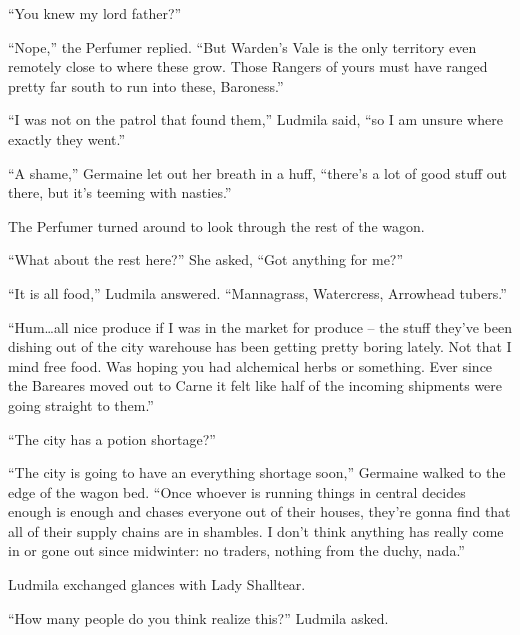 “You knew my lord father?”

 

“Nope,” the Perfumer replied. “But Warden’s Vale is the only territory even remotely close to where these grow. Those Rangers of yours must have ranged pretty far south to run into these, Baroness.”

 

“I was not on the patrol that found them,” Ludmila said, “so I am unsure where exactly they went.”

 

“A shame,” Germaine let out her breath in a huff, “there’s a lot of good stuff out there, but it’s teeming with nasties.”

 

The Perfumer turned around to look through the rest of the wagon.

 

“What about the rest here?” She asked, “Got anything for me?”

 

“It is all food,” Ludmila answered. “Mannagrass, Watercress, Arrowhead tubers.”

 

“Hum…all nice produce if I was in the market for produce – the stuff they’ve been dishing out of the city warehouse has been getting pretty boring lately. Not that I mind free food. Was hoping you had alchemical herbs or something. Ever since the Bareares moved out to Carne it felt like half of the incoming shipments were going straight to them.”

 

“The city has a potion shortage?”

 

“The city is going to have an everything shortage soon,” Germaine walked to the edge of the wagon bed. “Once whoever is running things in central decides enough is enough and chases everyone out of their houses, they’re gonna find that all of their supply chains are in shambles. I don’t think anything has really come in or gone out since midwinter: no traders, nothing from the duchy, nada.”

 

Ludmila exchanged glances with Lady Shalltear.

 

“How many people do you think realize this?” Ludmila asked.

 

